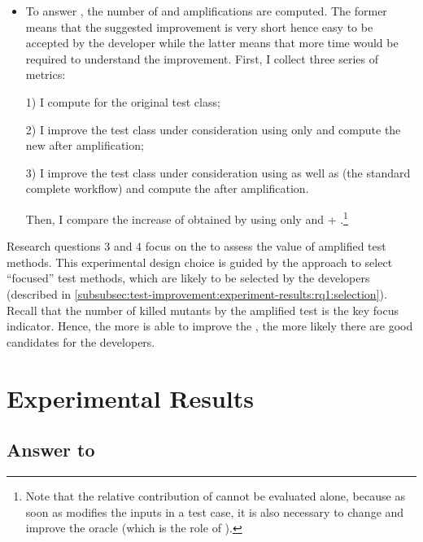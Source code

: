 \begin{itemize}
	\item \textbf{\rqAmplVersusIAmpl}
	To answer \rqAmplVersusIAmpl, the number of \Aampl and \Iampl amplifications are computed. 
	The former means that the suggested improvement is very short hence easy to be accepted by the developer while the latter means that more time would be required to understand the improvement.
	First, I collect three series of metrics: 
	
	1) I compute \ams for the original test class;
	
	2) I improve the test class under consideration using only \Aampl{} and compute the new \ams after amplification; 
	
	3) I improve the test class under consideration using \Iampl{} as well as \Aampl{} (the standard complete \dspot workflow) and compute the \ams after amplification. 
	
	Then, I compare the increase of \ms obtained by using \Aampl{} only and \Aampl{} + \Iampl{}.\footnote{Note that the relative contribution of \Iampl{} cannot be evaluated alone, because as soon as \dspot modifies the inputs in a test case, it is also necessary to change and improve the oracle (which is the role of \Aampl{}).}
\end{itemize}

Research questions 3 and 4 focus on the \ms to assess the value of amplified test methods.
This experimental design choice is guided by the approach to select ``focused'' test methods, which are likely to be selected by the developers (described in \autoref{subsubsec:test-improvement:experiment-results:rq1:selection}). 
Recall that the number of killed mutants by the amplified test is the key focus indicator. 
Hence, the more \dspot is able to improve the \ms, the more likely there are good candidates for the developers.

\section{Experimental Results}
\label{sec:test-improvement:experiment-results}


\subsection{Answer to \rqpullrequest}
\label{subsec:test-improvement:experiment-results:rq1}

